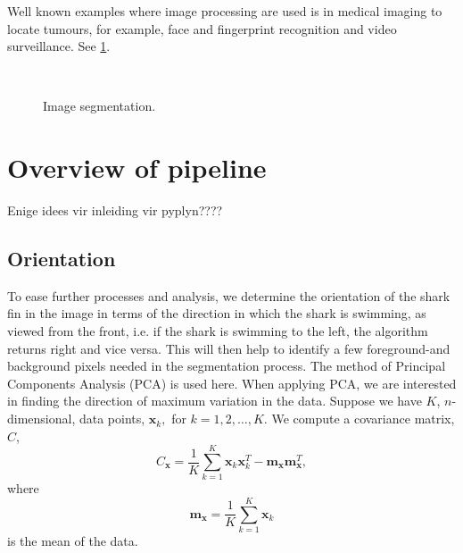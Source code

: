 \documentclass[a4paper,10pt]{article}
\begin{document}
Well known examples where image processing are used is
in medical imaging to locate tumours, for example, face and
fingerprint recognition and video surveillance.  See \ref{examples}.

\begin{figure}[H]
\centering
\mbox{ \quad
{}}
\caption{Image segmentation.}
\label{examples}
\end{figure}

\newpage
\section{Overview of pipeline}
Enige idees vir inleiding vir pyplyn????

\subsection{Orientation}
To ease further processes and analysis, we determine the orientation of the shark fin in the image in terms of the direction in which the shark is swimming, as viewed from the front, 
i.e. if the shark is swimming to the left, the algorithm returns right and vice versa. This will then help to identify a few foreground-and background
pixels needed in the segmentation process.  
The method of Principal Components Analysis (PCA) is used here.  When applying PCA, we are interested in finding the direction of maximum variation in 
the data.  Suppose we have $K$, $n$-dimensional, data points, $\mathbf{x}_k,$ for $k=1,2, \ldots ,K$. We compute a covariance matrix, $C$,
\[
 C_{\mathbf{x}} = \frac{1}{K} \sum_{k=1}^{K} \mathbf{x}_{k}\mathbf{x}_{k}^{T} - \mathbf{m}_{\mathbf{x}}\mathbf{m}_{\mathbf{x}}^{T} 
,\]
where
\[
 \mathbf{m}_{\mathbf{x}} = \frac{1}{K} \sum_{k=1}^{K}\mathbf{x}_{k}
\]
is the mean of the data.  \\
\end{document}
